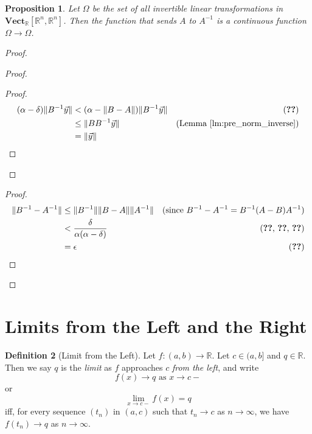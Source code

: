 \documentclass{book}
\let\qed\relax
\newtheorem{prop}{Proposition}[chapter]
\theoremstyle{definition}
\newtheorem{df}[prop]{Definition}
\begin{document}
\begin{prop}
Let $\Omega$ be the set of all invertible linear transformations in $\mathbf{Vect}_\mathbb{R}[\mathbb{R}^n, \mathbb{R}^n]$. Then the function that sends $A$ to $A^{-1}$ is a continuous function $\Omega \rightarrow \Omega$.
\end{prop}

\begin{proof}
\pf
{}
\begin{proof}
	\begin{proof}
		\pf
		\begin{align*}
			(\alpha - \delta) \| B^{-1} \vec{y} \|
			& < (\alpha - \| B - A \|) \| B^{-1} \vec{y} \| & (\text{\stepref{3}}) \\
			& \leq \| B B^{-1} \vec{y} \| & (\text{Lemma \ref{lm:pre_norm_inverse}}) \\
			& = \| \vec{y} \|
		\end{align*}
	\end{proof}
\end{proof}
\begin{proof}
	\pf
	\begin{align*}
		\| B^{-1} - A^{-1} \| & \leq \| B^{-1} \| \| B - A \| \| A^{-1} \| & (\text{since } B^{-1} - A^{-1} = B^{-1} (A - B) A^{-1}) \\
		& < \frac{\delta}{\alpha(\alpha - \delta)}  & (\text{\stepref{1a}, \stepref{3}, \stepref{3a}}) \\
		& = \epsilon & (\text{\stepref{2}})
	\end{align*}
\end{proof}
\qed
\end{proof}

\section{Limits from the Left and the Right}

\begin{df}[Limit from the Left]
Let $f : (a,b) \rightarrow \mathbb{R}$. Let $c \in (a,b]$ and $q \in \mathbb{R}$. Then we say $q$ is the \emph{limit} as $f$ approaches $c$ \emph{from the left}, and write
\[ f(x) \rightarrow q \text{ as } x \rightarrow c- \]
or
\[ \lim_{x \rightarrow c-} f(x) = q \]
iff, for every sequence $(t_n)$ in $(a,c)$ such that $t_n \rightarrow c$ as $n \rightarrow \infty$, we have $f(t_n) \rightarrow q$ as $n \rightarrow \infty$.
\end{df}
\end{document}
